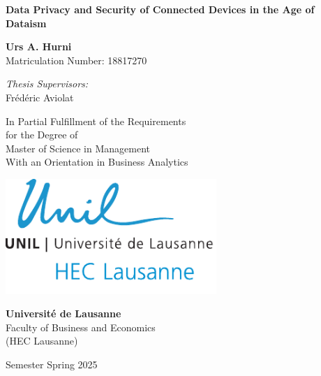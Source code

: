 \begin{titlepage}
    \centering
    \vspace{1cm}
    
    \textbf{\LARGE Data Privacy and Security of Connected Devices in the Age of Dataism}
    
    \vspace{1.5cm}
    
    \textbf{Urs A. Hurni} \\
    Matriculation Number: 18817270
    
    \vspace{0.5cm}
    
    \textit{Thesis Supervisors:} \\
    Frédéric Aviolat
    
    \vfill
    
    In Partial Fulfillment of the Requirements\\
    for the Degree of \\
    Master of Science in Management \\
    With an Orientation in Business Analytics
    
    \vfill
    
    \begin{minipage}{0.45\textwidth}
        \centering
        \includegraphics[width=0.6\textwidth]{figures/logo/lo_unil_hec06_bleu.pdf}
    \end{minipage}%
    \hfill
    
    \vspace{0.5cm}
    
    \textbf{Université de Lausanne}\\
    Faculty of Business and Economics\\
    (HEC Lausanne)
    \vspace{1cm}
    
    Semester Spring 2025

\end{titlepage}
